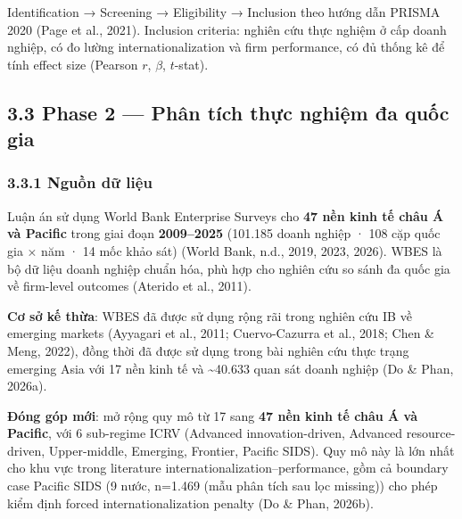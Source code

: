 \documentclass[12pt,a4paper]{article}
\begin{document}
Identification → Screening → Eligibility → Inclusion theo hướng dẫn
PRISMA 2020 (Page et al., 2021). Inclusion criteria: nghiên cứu thực
nghiệm ở cấp doanh nghiệp, có đo lường internationalization và firm
performance, có đủ thống kê để tính effect size (Pearson \(r\),
\(\beta\), \(t\)-stat).

\hypertarget{33-phase-2--phuxe2n-tuxedch-thux1ef1c-nghiux1ec7m-ux111a-quux1ed1c-gia}{%
\subsection{3.3 Phase 2 --- Phân tích thực nghiệm đa quốc
gia}\label{33-phase-2--phuxe2n-tuxedch-thux1ef1c-nghiux1ec7m-ux111a-quux1ed1c-gia}}

\hypertarget{331-nguux1ed3n-dux1eef-liux1ec7u}{%
\subsubsection{3.3.1 Nguồn dữ
liệu}\label{331-nguux1ed3n-dux1eef-liux1ec7u}}

Luận án sử dụng World Bank Enterprise Surveys cho \textbf{47 nền kinh tế
châu Á và Pacific} trong giai đoạn \textbf{2009--2025} (101.185 doanh
nghiệp · 108 cặp quốc gia × năm · 14 mốc khảo sát) (World Bank, n.d.,
2019, 2023, 2026). WBES là bộ dữ liệu doanh nghiệp chuẩn hóa, phù hợp
cho nghiên cứu so sánh đa quốc gia về firm-level outcomes (Aterido et
al., 2011).

\textbf{Cơ sở kế thừa}: WBES đã được sử dụng rộng rãi trong nghiên cứu
IB về emerging markets (Ayyagari et al., 2011; Cuervo-Cazurra et al.,
2018; Chen \& Meng, 2022), đồng thời đã được sử dụng trong bài nghiên
cứu thực trạng emerging Asia với 17 nền kinh tế và \textasciitilde40.633
quan sát doanh nghiệp (Do \& Phan, 2026a).

\textbf{Đóng góp mới}: mở rộng quy mô từ 17 sang \textbf{47 nền kinh tế
châu Á và Pacific}, với 6 sub-regime ICRV (Advanced innovation-driven,
Advanced resource-driven, Upper-middle, Emerging, Frontier, Pacific
SIDS). Quy mô này là lớn nhất cho khu vực trong literature
internationalization--performance, gồm cả boundary case Pacific SIDS (9
nước, n=1.469 (mẫu phân tích sau lọc missing)) cho phép kiểm định forced
internationalization penalty (Do \& Phan, 2026b).
\end{document}
